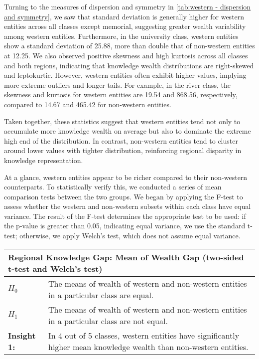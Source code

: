 Turning to the measures of dispersion and symmetry in \autoref{tab:western - dispersion and symmetry}, we saw that standard deviation is generally higher for western entities across all classes except memorial, suggesting greater wealth variability among western entities. Furthermore, in the university class, western entities show a standard deviation of 25.88, more than double that of non-western entities at 12.25. We also observed positive skewness and high kurtosis across all classes and both regions, indicating that knowledge wealth distributions are right-skewed and leptokurtic. However, western entities often exhibit higher values, implying more extreme outliers and longer tails. For example, in the river class, the skewness and kurtosis for western entities are 19.54 and 868.56, respectively, compared to 14.67 and 465.42 for non-western entities.

Taken together, these statistics suggest that western entities tend not only to accumulate more knowledge wealth on average but also to dominate the extreme high end of the distribution. In contrast, non-western entities tend to cluster around lower values with tighter distribution, reinforcing regional disparity in knowledge representation.

At a glance, western entities appear to be richer compared to their non-western counterparts. To statistically verify this, we conducted a series of mean comparison tests between the two groups. We began by applying the F-test to assess whether the western and non-western subsets within each class have equal variance. The result of the F-test determines the appropriate test to be used: if the p-value is greater than 0.05, indicating equal variance, we use the standard t-test; otherwise, we apply Welch's test, which does not assume equal variance.


\begin{table}[h!]
    \centering
    \renewcommand{\arraystretch}{1.3}
    \begin{tabular}{|l p{12cm}|} 
        \hline
        \multicolumn{2}{|l|}{\textbf{Regional Knowledge Gap: Mean of Wealth Gap (two-sided t-test and Welch's test)}} \\
        \hline
        \textbf{$H_0$} & The means of wealth of western and non-western entities in a particular class are equal. \\
        \textbf{$H_1$} & The means of wealth of western and non-western entities in a particular class are not equal. \\
        \hline
        \textbf{Insight 1:} & In 4 out of 5 classes, western entities have significantly higher mean knowledge wealth than non-western entities. \\
        \hline
    \end{tabular}
\end{table}

